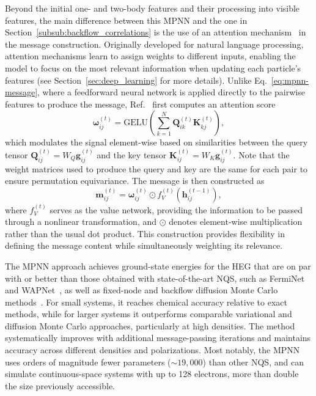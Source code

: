 Beyond the initial one- and two-body features and their processing into visible features, the main difference between this MPNN and the one in Section~\ref{subsub:backflow_correlations} is the use of an attention mechanism~\cite{vaswani_attention_2017} in the message construction. Originally developed for natural language processing, attention mechanisms learn to assign weights to different inputs, enabling the model to focus on the most relevant information when updating each particle's features (see Section~\ref{sec:deep_learning} for more details).
Unlike Eq.~\eqref{eq:mpnn-message}, where a feedforward neural network is applied directly to the pairwise features to produce the message, Ref.~\cite{pescia_message-passing_2024} first computes an attention score
\begin{equation}
    \boldsymbol{\omega}_{ij}^{(t)} = \mathrm{GELU}
    \left(\sum_{k=1}^N \mathbf{Q}_{ik}^{(t)} \mathbf{K}_{kj}^{(t)} \right),
\end{equation}
which modulates the signal element-wise based on similarities between the query tensor $\mathbf{Q}_{ij}^{(t)} = W_Q \mathbf{g}_{ij}^{(t)}$ and the key tensor $\mathbf{K}_{ij}^{(t)} = W_K \mathbf{g}_{ij}^{(t)}$.
Note that the weight matrices used to produce the query and key are the same for each pair to ensure permutation equivariance.
The message is then constructed as
\begin{equation}
    \mathbf{m}_{ij}^{(t)} = \boldsymbol{\omega}_{ij}^{(t)} \odot f_V^{(t)}(\mathbf{h}_{ij}^{(t-1)}),
\end{equation}
where $f_V^{(t)}$ serves as the value network, providing the information to be passed through a nonlinear transformation, and $\odot$ denotes element-wise multiplication rather than the usual dot product. This construction provides flexibility in defining the message content while simultaneously weighting its relevance.

The MPNN approach achieves ground-state energies for the HEG that are on par with or better than those obtained with state-of-the-art NQS, such as FermiNet~\cite{cassella_discovering_2023} and WAPNet~\cite{wilson_neural_2023}, as well as fixed-node and backflow diffusion Monte Carlo methods~\cite{lopez_rios_inhomogeneous_2006, azadi_low-density_2022}. For small systems, it reaches chemical accuracy relative to exact methods, while for larger systems it outperforms comparable variational and diffusion Monte Carlo approaches, particularly at high densities. The method systematically improves with additional message-passing iterations and maintains accuracy across different densities and polarizations. Most notably, the MPNN uses orders of magnitude fewer parameters ($\sim 19{,}000$) than other NQS, and can simulate continuous-space systems with up to 128 electrons, more than double the size previously accessible.

